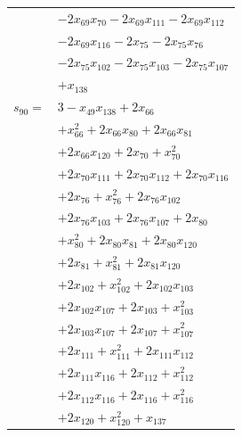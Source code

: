 \begin{longtable}{@{}r@{\;}l@{}}
 & \(\displaystyle -2x_{69}x_{70} -2x_{69}x_{111} -2x_{69}x_{112}\) \\
 & \(\displaystyle -2x_{69}x_{116} -2x_{75} -2x_{75}x_{76}\) \\
 & \(\displaystyle -2x_{75}x_{102} -2x_{75}x_{103} -2x_{75}x_{107}\) \\
 & \(\displaystyle +x_{138}\) \\[3pt]
\(s_{90}=\) & \(\displaystyle 3 -x_{49}x_{138} +2x_{66}\) \\
 & \(\displaystyle +x_{66}^{2} +2x_{66}x_{80} +2x_{66}x_{81}\) \\
 & \(\displaystyle +2x_{66}x_{120} +2x_{70} +x_{70}^{2}\) \\
 & \(\displaystyle +2x_{70}x_{111} +2x_{70}x_{112} +2x_{70}x_{116}\) \\
 & \(\displaystyle +2x_{76} +x_{76}^{2} +2x_{76}x_{102}\) \\
 & \(\displaystyle +2x_{76}x_{103} +2x_{76}x_{107} +2x_{80}\) \\
 & \(\displaystyle +x_{80}^{2} +2x_{80}x_{81} +2x_{80}x_{120}\) \\
 & \(\displaystyle +2x_{81} +x_{81}^{2} +2x_{81}x_{120}\) \\
 & \(\displaystyle +2x_{102} +x_{102}^{2} +2x_{102}x_{103}\) \\
 & \(\displaystyle +2x_{102}x_{107} +2x_{103} +x_{103}^{2}\) \\
 & \(\displaystyle +2x_{103}x_{107} +2x_{107} +x_{107}^{2}\) \\
 & \(\displaystyle +2x_{111} +x_{111}^{2} +2x_{111}x_{112}\) \\
 & \(\displaystyle +2x_{111}x_{116} +2x_{112} +x_{112}^{2}\) \\
 & \(\displaystyle +2x_{112}x_{116} +2x_{116} +x_{116}^{2}\) \\
 & \(\displaystyle +2x_{120} +x_{120}^{2} +x_{137}\) \\[3pt]
\end{longtable}
\endgroup
